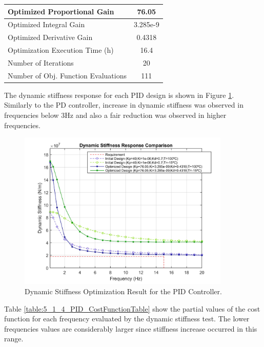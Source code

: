 \begin{table}[H]
	\label{table:5_1_4_PIDContExecution}
	\centering
	\resizebox{7cm}{!} {
		\begin{tabular}{|l|c|}
			\hline
			Optimized Proportional Gain & 76.05 \\ \hline
			Optimized Integral Gain & 3.285e-9 \\ \hline
			Optimized Derivative Gain & 0.4318 \\ \hline
			Optimization Execution Time (h) & 16.4 \\ \hline
			Number of Iterations & 20 \\ \hline		
			Number of Obj. Function Evaluations & 111 \\ \hline		
	\end{tabular}}
\end{table}

The  dynamic stiffness response for each PID design is shown in Figure \ref{fig:5_1_4_PID_DynStif}. Similarly to the PD controller, increase in dynamic stiffness was observed in frequencies below 3Hz and also a fair reduction was observed in higher frequencies.

\begin{figure}[H]
	\centering
	\centerline{\includegraphics[width=0.9\textwidth]{Figuras/5.OptimizationResults/5-1-4-PID-DynamicStiffnessComparison.jpg}}
	\caption{Dynamic Stiffness Optimization Result for the PID Controller.}
	\label{fig:5_1_4_PID_DynStif}
\end{figure}

Table \ref{table:5_1_4_PID_CostFunctionTable} show the partial values of the cost function for each frequency evaluated by the dynamic stiffness test. The lower frequencies values are considerably larger since stiffness increase occurred in this range. 


